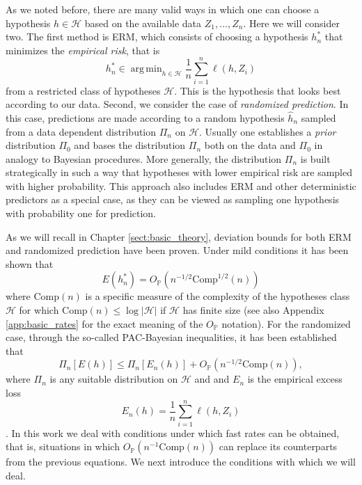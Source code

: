 \documentclass{uvamath}
\newcommand*{\calH}{\mathcal{H}}
\newcommand*{\bbP}{\mathbb{P}}
\DeclareMathOperator*{\argmin}{arg\,min}
\theoremstyle{remark}
\theoremstyle{definition}
\theoremstyle{definition}
\theoremstyle{definition}
\theoremstyle{definition}
\theoremstyle{definition}
\begin{document}
As we noted before, there are many valid ways in which one can choose
a hypothesis $h\in\calH$ based on the available data
$Z_1,\dots,Z_n$. Here we will consider two. The first method is ERM,
which consists of choosing a hypothesis $h^*_n$ that minimizes the
\textit{empirical risk}, that is
\begin{equation*}
  h^*_n \in \argmin_{h\in\calH}\frac{1}{n}\sum_{i=1}^n\ell(h,Z_i)
\end{equation*}
from a restricted class of hypotheses $\calH$. This is the hypothesis
that looks best according to our data. Second, we consider the case of
\textit{randomized prediction}. In this case, predictions are made
according to a random hypothesis $\hat{h}_n$ sampled from a data
dependent distribution $\Pi_n$ on $\calH$. Usually one establishes a
\textit{prior} distribution $\Pi_0$ and bases the distribution $\Pi_n$
both on the data and $\Pi_0$ in analogy to Bayesian procedures. More
generally, the distribution $\Pi_n$ is built strategically in such a
way that hypotheses with lower empirical risk are sampled with higher
probability. This approach also includes ERM and other deterministic
predictors as a special case, as they can be viewed as sampling one
hypothesis with probability one for prediction.

As we will recall in Chapter \ref{sect:basic_theory}, deviation bounds
for both ERM and randomized prediction have been proven. Under mild
conditions it has been shown that
\begin{equation}
E(h^*_n) = O_{\bbP}(n^{-1/2}\mathrm{Comp}^{1/2}(n))
\end{equation}
\citep[see][]{vapnik_statistical_1998} where $\mathrm{Comp}(n)$ is a
specific measure of the complexity of the hypotheses class $\calH$ for
which $\mathrm{Comp}(n) \leq \log|\calH|$ if $\calH$ has finite size
(see also Appendix \ref{app:basic_rates} for the exact meaning of the
$O_\bbP$ notation). For the randomized case, through the so-called
PAC-Bayesian inequalities, it has been established that
\begin{equation*}
  \Pi_n[E(h)] \leq \Pi_n[E_n(h)] + O_{\bbP}(n^{-1/2}\mathrm{Comp}(n)),
\end{equation*}
where $\Pi_n$ is any suitable distribution on $\calH$ and and $E_n$ is
the empirical excess loss
\begin{equation*}
  E_n(h) = \frac{1}{n}\sum_{i=1}^n\ell(h,Z_i)
\end{equation*}
\citep[see][]{mcallester_pac-bayesian_1998}. In this work we deal with
conditions under which fast rates can be obtained, that is, situations
in which $O_{\bbP}(n^{-1}\mathrm{Comp}(n))$ can replace its
counterparts from the previous equations. We next introduce the
conditions with which we will deal.
\end{document}
